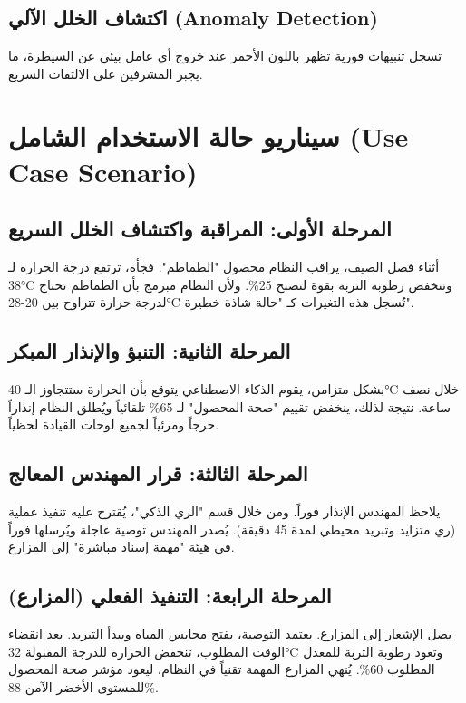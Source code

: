 \documentclass[12pt,a4paper]{article}
\begin{document}
\subsection{اكتشاف الخلل الآلي (Anomaly Detection)}
تسجل تنبيهات فورية تظهر باللون الأحمر عند خروج أي عامل بيئي عن السيطرة، ما يجبر المشرفين على الالتفات السريع.

\vspace{0.5cm}
\newpage

\section{سيناريو حالة الاستخدام الشامل (Use Case Scenario)}

\subsection{المرحلة الأولى: المراقبة واكتشاف الخلل السريع}
أثناء فصل الصيف، يراقب النظام محصول "الطماطم". فجأة، ترتفع درجة الحرارة لـ 38°C وتنخفض رطوبة التربة بقوة لتصبح 25\%. ولأن النظام مبرمج بأن الطماطم تحتاج لدرجة حرارة تتراوح بين 20-28°C تُسجل هذه التغيرات كـ "حالة شاذة خطيرة".

\subsection{المرحلة الثانية: التنبؤ والإنذار المبكر}
بشكل متزامن، يقوم الذكاء الاصطناعي يتوقع بأن الحرارة ستتجاوز الـ 40°C خلال نصف ساعة. نتيجة لذلك، ينخفض تقييم "صحة المحصول" لـ 65\% تلقائياً ويُطلق النظام إنذاراً حرجاً ومرئياً لجميع لوحات القيادة لحظياً.

\subsection{المرحلة الثالثة: قرار المهندس المعالج}
يلاحظ المهندس الإنذار فوراً. ومن خلال قسم "الري الذكي"، يُقترح عليه تنفيذ عملية (ري متزايد وتبريد محيطي لمدة 45 دقيقة). يُصدر المهندس توصية عاجلة ويُرسلها فوراً في هيئة "مهمة إسناد مباشرة" إلى المزارع.

\subsection{المرحلة الرابعة: التنفيذ الفعلي (المزارع)}
يصل الإشعار إلى المزارع. يعتمد التوصية، يفتح محابس المياه ويبدأ التبريد. بعد انقضاء الوقت المطلوب، تنخفض الحرارة للدرجة المقبولة 32°C وتعود رطوبة التربة للمعدل المطلوب 60\%. يُنهي المزارع المهمة تقنياً في النظام، ليعود مؤشر صحة المحصول للمستوى الأخضر الآمن 88\%.
\end{document}

